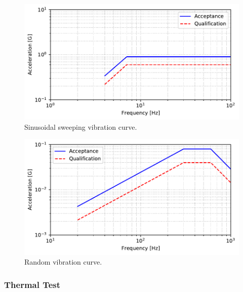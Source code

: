 
\begin{figure}[!ht]
    \begin{center}
        \includegraphics[width=\textwidth]{curves/sine_test.pdf}
        \caption{Sinusoidal sweeping vibration curve.}
        \label{fig:vibration-sinusoidal-curve}
    \end{center}
\end{figure}

\begin{figure}[!ht]
    \begin{center}
        \includegraphics[width=\textwidth]{curves/random_vibration.pdf}
        \caption{Random vibration curve.}
        \label{fig:vibration-test}
    \end{center}
\end{figure}

\subsubsection{Thermal Test}

